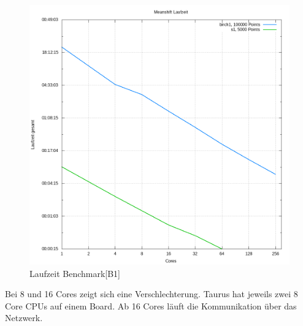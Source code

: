 	\begin{figure}[H]
		\centering
		\includegraphics[scale=0.61]{../meanshift/output/pics/benchmark.png} 
		\caption{Laufzeit Benchmark[B1]}
	\end{figure}
	Bei 8 und  16 Cores zeigt sich eine Verschlechterung. Taurus hat jeweils zwei 8 Core CPUs auf einem Board.
	Ab 16 Cores läuft die Kommunikation über das Netzwerk.\\
	\newpage
